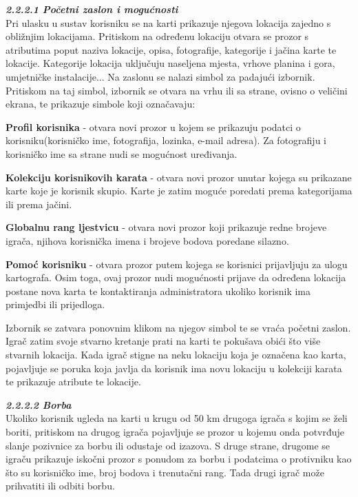 		\textbf{\textit{\small2.2.2.1 Početni zaslon i mogućnosti}}\\
		
		
		{Pri ulasku u sustav korisniku se na karti prikazuje njegova lokacija zajedno s obližnjim lokacijama. Pritiskom na određenu lokaciju otvara se prozor s atributima poput naziva lokacije, opisa, fotografije, kategorije i jačina karte te lokacije. Kategorije lokacija uključuju naseljena mjesta, vrhove planina i gora, umjetničke instalacije... Na zaslonu se nalazi simbol za padajući izbornik. Pritiskom na taj simbol, izbornik se otvara na vrhu ili sa strane, ovisno o veličini ekrana, te prikazuje simbole koji označavaju:  }
		
			\begin{packed_item}
			\item {\textbf{Profil korisnika }- otvara novi prozor u kojem se prikazuju podatci o korisniku(korisničko ime, fotografija, lozinka, e-mail adresa). Za fotografiju i korisničko ime sa strane nudi se mogućnost uređivanja.}\\
			\item {\textbf{Kolekciju korisnikovih karata} - otvara novi prozor unutar kojega su prikazane karte koje je korisnik skupio. Karte je zatim moguće poredati prema kategorijama ili prema jačini.}\\
			\item {\textbf{Globalnu rang ljestvicu} - otvara novi prozor koji prikazuje redne brojeve igrača, njihova korisnička imena i brojeve bodova poredane silazno.}\\
			\item {\textbf{Pomoć korisniku} - otvara prozor putem kojega se korisnici prijavljuju za ulogu kartografa. Osim toga, ovaj prozor nudi mogućnosti prijave da određena lokacija postane nova karta te kontaktiranja administratora ukoliko korisnik ima primjedbi ili prijedloga. }
			\end{packed_item}
		
		{Izbornik se zatvara ponovnim klikom na njegov simbol te se vraća početni zaslon. Igrač zatim svoje stvarno kretanje prati na karti te pokušava obići što više stvarnih lokacija. Kada igrač stigne na neku lokaciju koja je označena kao karta, pojavljuje se poruka koja javlja da korisnik ima novu lokaciju u kolekciji karata te prikazuje atribute te lokacije.}\newpage
		
		\textbf{\textit{\small2.2.2.2 Borba}}\\
		
		Ukoliko korisnik ugleda na karti u krugu od 50 km drugoga igrača s kojim se želi boriti, pritiskom na drugog igrača pojavljuje se prozor u kojemu onda potvrđuje slanje pozivnice za borbu ili odustaje od izazova. S druge strane, drugome se  igraču prikazuje iskočni prozor s ponudom za borbu i podatcima o protivniku kao što su korisničko ime, broj bodova i trenutačni rang. Tada drugi igrač može prihvatiti ili odbiti borbu. \\
			 
